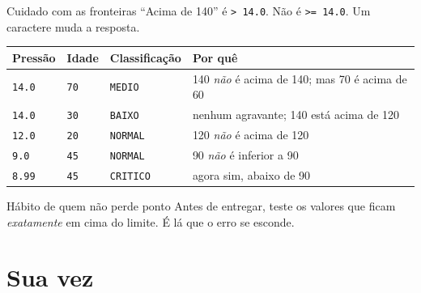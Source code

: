 \documentclass[aspectratio=169]{beamer}
\newcommand{\code}[1]{\texttt{\small #1}}
\begin{document}
\begin{frame}[fragile]{Cuidado com as fronteiras}
  ``Acima de 140'' é \code{> 14.0}. Não é \code{>= 14.0}.
  Um caractere muda a resposta.

  \vspace{0.25cm}
  \begin{center}
  \scriptsize
  \begin{tabular}{@{}llll@{}}
    \toprule
    \textbf{Pressão} & \textbf{Idade} & \textbf{Classificação} & \textbf{Por quê} \\
    \midrule
    \code{14.0} & \code{70} & \code{MEDIO}  & 140 \emph{não} é acima de 140; mas 70 é acima de 60 \\
    \code{14.0} & \code{30} & \code{BAIXO}  & nenhum agravante; 140 está acima de 120 \\
    \code{12.0} & \code{20} & \code{NORMAL} & 120 \emph{não} é acima de 120 \\
    \code{9.0}  & \code{45} & \code{NORMAL} & 90 \emph{não} é inferior a 90 \\
    \code{8.99} & \code{45} & \code{CRITICO}& agora sim, abaixo de 90 \\
    \bottomrule
  \end{tabular}
  \end{center}

  \vspace{0.25cm}
  \begin{block}{Hábito de quem não perde ponto}
    Antes de entregar, teste os valores que ficam \emph{exatamente} em
    cima do limite. É lá que o erro se esconde.
  \end{block}
\end{frame}

\section{Sua vez}
\end{document}
